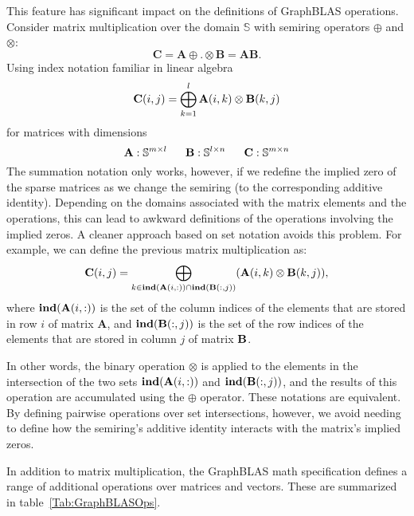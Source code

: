 This feature has significant impact on the definitions of GraphBLAS operations.   
Consider matrix multiplication over the domain $\mathbb{S}$ 
with semiring operators 
$\oplus$ and $\otimes$:
 $$
   \mathbf{C} = \mathbf{A} {\oplus}.{\otimes} \mathbf{B} = \mathbf{A} \mathbf{B}.
$$
Using index notation familiar in linear algebra
  $$
   {\bf C}(i,j) = \bigoplus_{k=1}^l {\bf A}(i,k) \otimes {\bf B}(k,j)
  $$
for matrices with dimensions
$$
  {\bf A} : \mathbb{S}^{m \times l} ~~~~~
  {\bf B} : \mathbb{S}^{l \times n} ~~~~~
  {\bf C} : \mathbb{S}^{m \times n}
$$
The summation notation only works, however, if we redefine the implied zero of the 
sparse matrices as we change the semiring (to the corresponding additive identity).   
Depending on the domains associated with the
matrix elements and the operations, this can lead to awkward definitions of the
operations involving the implied zeros.  A cleaner approach based on set notation
avoids this problem.  For example, we can define the previous matrix multiplication
as:   
$$
\mathbf{C}(i,j)
= \bigoplus_{k \in \mathbf{ind}({\bf {A}}(i,:)) \cap
\mathbf{ind}({\bf {B}}(:,j))} ({\bf {A}}(i,k)
\otimes {\bf {B}}(k,j)),
$$ 
where $\mathbf{ind}({\bf {A}}(i,:))$ is the set of the column indices of the 
elements that are stored in row $i$ of matrix $\mathbf{A}$, and
$\mathbf{ind}({\bf {B}}(:,j))$ is the set of the row indices of the 
elements that are stored in column $j$ of matrix ${\bf B}$.

In other words, the binary operation $\otimes$ is applied to the elements in the intersection of the 
two sets $\mathbf{ind}({\bf {A}}(i,:))$ and $\mathbf{ind}({\bf {B}}(:,j))$, 
and the results of this operation are accumulated using the $\oplus$ operator.
These notations are equivalent. By defining  pairwise operations over
set intersections, however, we avoid needing to define how the semiring's additive identity 
interacts with the matrix's implied zeros.

In addition to matrix multiplication, the GraphBLAS math specification defines
a range of additional operations over matrices and vectors.  These are summarized in table~\ref{Tab:GraphBLASOps}.


